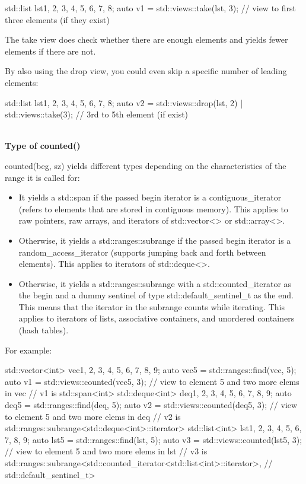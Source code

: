 \begin{cpp}
std::list lst{1, 2, 3, 4, 5, 6, 7, 8};
auto v1 = std::views::take(lst, 3); // view to first three elements (if they exist)
\end{cpp}

The take view does check whether there are enough elements and yields fewer elements if there are not.

By also using the drop view, you could even skip a specific number of leading elements:

\begin{cpp}
std::list lst{1, 2, 3, 4, 5, 6, 7, 8};
auto v2 = std::views::drop(lst, 2) | std::views::take(3); // 3rd to 5th element (if exist)
\end{cpp}

\noindent
\hspace*{\fill} \\ %
\textbf{Type of counted()}

counted(beg, sz) yields different types depending on the characteristics of the range it is called for:

\begin{itemize}
\item
It yields a std::span if the passed begin iterator is a contiguous\_iterator (refers to elements that are stored in contiguous memory). This applies to raw pointers, raw arrays, and iterators of std::vector<> or std::array<>.

\item
Otherwise, it yields a std::ranges::subrange if the passed begin iterator is a random\_access\_iterator (supports jumping back and forth between elements). This applies to iterators of std::deque<>.

\item
Otherwise, it yields a std::ranges::subrange with a std::counted\_iterator as the begin and a dummy sentinel of type std::default\_sentinel\_t as the end. This means that the iterator in the subrange counts while iterating. This applies to iterators of lists, associative containers, and unordered containers (hash tables).
\end{itemize}

For example:

\begin{cpp}
std::vector<int> vec{1, 2, 3, 4, 5, 6, 7, 8, 9};
auto vec5 = std::ranges::find(vec, 5);
auto v1 = std::views::counted(vec5, 3); // view to element 5 and two more elems in vec
	// v1 is std::span<int>
std::deque<int> deq{1, 2, 3, 4, 5, 6, 7, 8, 9};
auto deq5 = std::ranges::find(deq, 5);
auto v2 = std::views::counted(deq5, 3); // view to element 5 and two more elems in deq
	// v2 is std::ranges::subrange<std::deque<int>::iterator>
std::list<int> lst{1, 2, 3, 4, 5, 6, 7, 8, 9};
auto lst5 = std::ranges::find(lst, 5);
auto v3 = std::views::counted(lst5, 3); // view to element 5 and two more elems in lst
	// v3 is std::ranges::subrange<std::counted_iterator<std::list<int>::iterator>,
	// std::default_sentinel_t>
\end{cpp}

